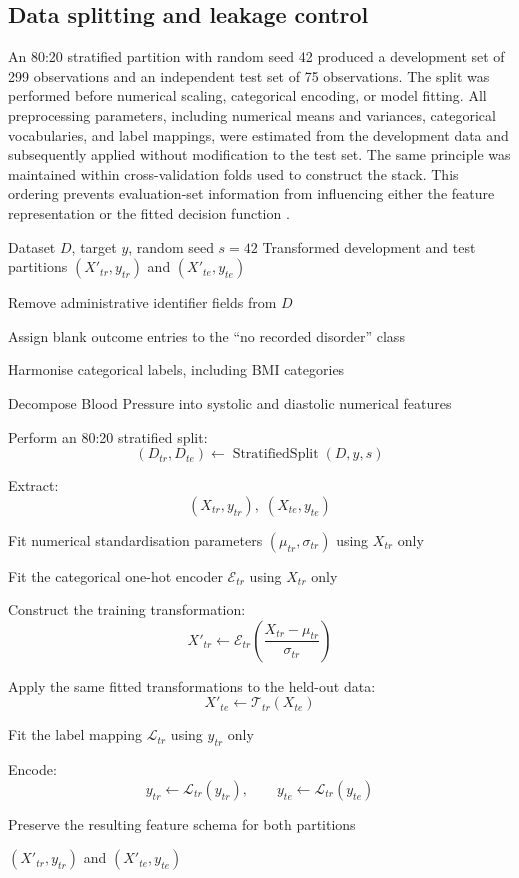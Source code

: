 \documentclass{elektr}
\begin{document}
\FloatBarrier

\subsection{Data splitting and leakage control}
An 80:20 stratified partition with random seed 42 produced a development set of 299 observations and an independent test set of 75 observations. The split was performed before numerical scaling, categorical encoding, or model fitting. All preprocessing parameters, including numerical means and variances, categorical vocabularies, and label mappings, were estimated from the development data and subsequently applied without modification to the test set. The same principle was maintained within cross-validation folds used to construct the stack. This ordering prevents evaluation-set information from influencing either the feature representation or the fitted decision function \cite{kapoor2023,efthimiou2024}.

\begin{algorithm}[H]
\caption{Leakage-Controlled Data Preparation and Feature Transformation}
\label{alg:prep}
\small
\begin{algorithmic}[1]

\Require Dataset $D$, target $y$, random seed $s=42$
\Ensure Transformed development and test partitions
$(X'_{tr},y_{tr})$ and $(X'_{te},y_{te})$

\State Remove administrative identifier fields from $D$

\State Assign blank outcome entries to the
``no recorded disorder'' class

\State Harmonise categorical labels, including BMI categories

\State Decompose Blood Pressure into systolic and
diastolic numerical features

\State Perform an 80:20 stratified split:
\[
(D_{tr},D_{te})\leftarrow
\operatorname{StratifiedSplit}(D,y,s)
\]

\State Extract:
\[
(X_{tr},y_{tr}),\;(X_{te},y_{te})
\]

\State Fit numerical standardisation parameters
$(\mu_{tr},\sigma_{tr})$ using $X_{tr}$ only

\State Fit the categorical one-hot encoder
$\mathcal{E}_{tr}$ using $X_{tr}$ only

\State Construct the training transformation:
\[
X'_{tr}
\leftarrow
\mathcal{E}_{tr}
\left(
\frac{X_{tr}-\mu_{tr}}{\sigma_{tr}}
\right)
\]

\State Apply the same fitted transformations to the
held-out data:
\[
X'_{te}
\leftarrow
\mathcal{T}_{tr}(X_{te})
\]

\State Fit the label mapping $\mathcal{L}_{tr}$ using
$y_{tr}$ only

\State Encode:
\[
y_{tr}\leftarrow\mathcal{L}_{tr}(y_{tr}),
\qquad
y_{te}\leftarrow\mathcal{L}_{tr}(y_{te})
\]

\State Preserve the resulting feature schema for both partitions

\State \Return
$(X'_{tr},y_{tr})$ and $(X'_{te},y_{te})$

\end{algorithmic}
\end{algorithm}
\end{document}
